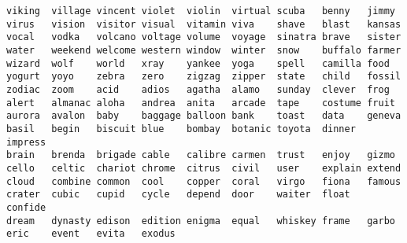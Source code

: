 \begin{verbatim}
viking	village	vincent	violet	violin	virtual	scuba	benny	jimmy
virus	vision	visitor	visual	vitamin	viva	shave	blast	kansas
vocal	vodka	volcano	voltage	volume	voyage	sinatra	brave	sister
water	weekend	welcome	western	window	winter	snow	buffalo	farmer
wizard	wolf	world	xray	yankee	yoga	spell	camilla	food
yogurt	yoyo	zebra	zero	zigzag	zipper	state	child	fossil
zodiac	zoom	acid	adios	agatha	alamo	sunday	clever	frog
alert	almanac	aloha	andrea	anita	arcade	tape	costume	fruit
aurora	avalon	baby	baggage	balloon	bank	toast	data	geneva
basil	begin	biscuit	blue	bombay	botanic	toyota	dinner	impress
brain	brenda	brigade	cable	calibre	carmen	trust	enjoy	gizmo
cello	celtic	chariot	chrome	citrus	civil	user	explain	extend
cloud	combine	common	cool	copper	coral	virgo	fiona	famous
crater	cubic	cupid	cycle	depend	door	waiter	float	confide
dream	dynasty	edison	edition	enigma	equal	whiskey	frame	garbo
eric	event	evita	exodus					

\end{verbatim}